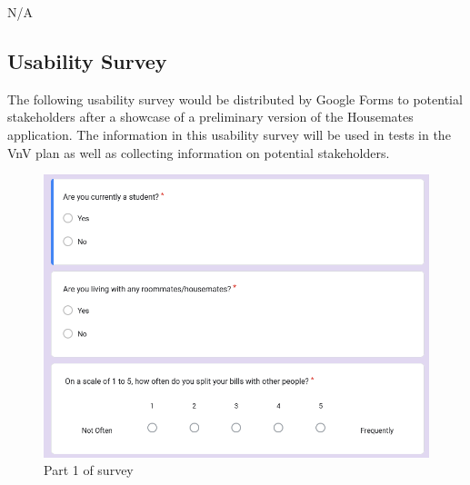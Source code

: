 \documentclass[12pt, titlepage]{article}
\begin{document}
N/A


\subsection{Usability Survey}

The following usability survey would be distributed by Google Forms to potential stakeholders after a showcase of a preliminary version of the Housemates application. The information in this usability survey will be used in tests in the VnV plan as well as collecting information on potential stakeholders.

\begin{figure}[H]
    \centering
    \includegraphics[width=1\linewidth]{survey_part_1.png}
    \caption{Part 1 of survey}
    \label{fig:pt1}
\end{figure}
\end{document}
